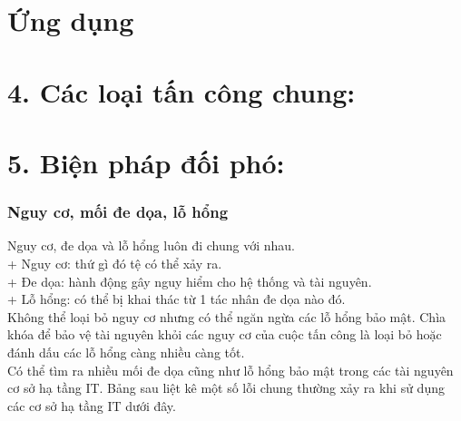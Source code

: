 \documentclass{beamer}
\begin{document}
\section{Ứng dụng} %
\section{4.	Các loại tấn công chung:} %
\section{5.	Biện pháp đối phó:} %
\begin{frame}
\frametitle{Nguy cơ, mối đe dọa, lỗ hổng}
Nguy cơ, đe dọa và lỗ hổng luôn đi chung với nhau.\\
+ Nguy cơ: thứ gì đó tệ có thể xảy ra.\\
+ Đe dọa: hành động gây nguy hiểm cho hệ thống và tài nguyên.\\
+ Lỗ hổng: có thể bị khai thác từ 1 tác nhân đe dọa nào đó.\\
Không thể loại bỏ nguy cơ nhưng có thể ngăn ngừa các lỗ hổng bảo mật.	Chìa khóa để bảo vệ tài nguyên khỏi các nguy cơ của cuộc tấn công là loại bỏ hoặc đánh dấu các lỗ hổng càng nhiều càng tốt.\\
Có thể tìm ra nhiều mối đe dọa cũng như lỗ hổng bảo mật trong các tài nguyên cơ sở hạ tầng IT. Bảng sau liệt kê một số lỗi chung thường xảy ra khi sử dụng các cơ sở hạ tầng IT dưới đây.

\end{frame}
\end{document}

